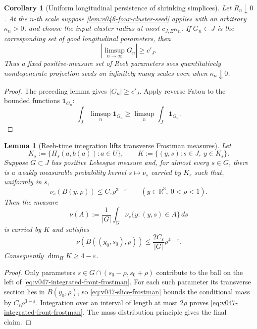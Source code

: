 \documentclass[10pt]{article}
\newtheorem{lemma}[theorem]{Lemma}
\newtheorem{corollary}[theorem]{Corollary}
\newcommand{\R}{\mathbb R}
\begin{document}
\begin{corollary}[Uniform longitudinal persistence of shrinking simplices]
\label{cor:v046-longitudinal-limsup}
Let \(R_n\downarrow0\).  At the \(n\)-th scale suppose
\cref{lem:v046-four-cluster-seed} applies with an arbitrary \(\kappa_n>0\), and choose the input
cluster radius at most \(c_{J,E}\kappa_n\).  If \(G_n\subset J\) is the corresponding set of good
longitudinal parameters, then
\[
\left|\limsup_{n\to\infty}G_n\right|
\ge c'_J.
\]
Thus a fixed positive-measure set of Reeb parameters sees quantitatively nondegenerate projection
seeds on infinitely many scales even when \(\kappa_n\downarrow0\).
\end{corollary}

\begin{proof}
The preceding lemma gives \(|G_n|\ge c'_J\).  Apply reverse Fatou to the bounded functions
\(\mathbf 1_{G_n}\):
\[
\int_J\limsup_n\mathbf 1_{G_n}
\ge
\limsup_n\int_J\mathbf 1_{G_n}.
\]
\end{proof}

\begin{lemma}[Reeb-time integration lifts transverse Frostman measures]
\label{lem:v047-slice-frostman-lift}
Let
\[
K_s:=\{\Pi_s(a,b(a)):a\in U\},
\qquad
K:=\{(y,s):s\in J,\ y\in K_s\}.
\]
Suppose \(G\subset J\) has positive Lebesgue measure and, for almost every \(s\in G\), there is a
weakly measurable probability kernel \(s\mapsto\nu_s\) carried by \(K_s\) such that, uniformly in
\(s\),
\begin{equation}
\label{eq:v047-slice-frostman}
\nu_s(B(y,\rho))
\le C_\varepsilon\rho^{3-\varepsilon}
\qquad
(y\in\R^3,\ 0<\rho<1).
\end{equation}
Then the measure
\begin{equation}
\label{eq:v047-integrated-front-measure}
\nu(A)
:=
\frac1{|G|}
\int_G
\nu_s\{y:(y,s)\in A\}\,ds
\end{equation}
is carried by \(K\) and satisfies
\begin{equation}
\label{eq:v047-integrated-front-frostman}
\boxed{
\nu(B((y_0,s_0),\rho))
\le
\frac{2C_\varepsilon}{|G|}\rho^{4-\varepsilon}.
}
\end{equation}
Consequently \(\dim_HK\ge4-\varepsilon\).
\end{lemma}

\begin{proof}
Only parameters \(s\in G\cap(s_0-\rho,s_0+\rho)\) contribute to the ball on the left of
\eqref{eq:v047-integrated-front-frostman}.  For each such parameter its transverse section lies in
\(B(y_0,\rho)\), so \eqref{eq:v047-slice-frostman} bounds the conditional mass by
\(C_\varepsilon\rho^{3-\varepsilon}\).  Integration over an interval of length at most \(2\rho\)
proves \eqref{eq:v047-integrated-front-frostman}.  The mass distribution principle gives the final
claim.
\end{proof}
\end{document}
